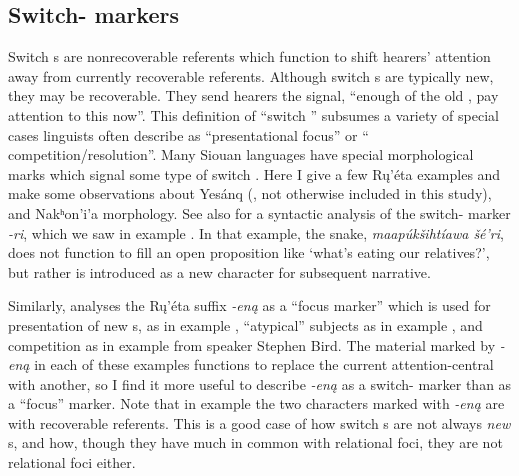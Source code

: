 \documentclass[output=paper]{LSP/langsci}
\begin{document}
\subsection{Switch- markers}\label{switchtopic}

	Switch s are nonrecoverable referents which function to shift hearers’ attention away from currently recoverable referents. Although switch s are typically new, they may be recoverable. They send hearers the signal, “enough of the old , pay attention to this now”. This definition of “switch ” subsumes a variety of special cases linguists often describe as “presentational focus” or “ competition/resolution”. Many Siouan languages have special morphological marks which signal some type of switch . Here I give a few Rų’éta examples and make some observations about Yesánq (, not otherwise included in this study),  and Nakʰon’i’a morphology. See also \citet[288--293]{Boyle2007} for a syntactic analysis of the  switch- marker \emph{-ri}, which we saw in example . In that example, the snake, \emph{maapúkšihtíawa šé’ri}, does not function to fill an open proposition like `what’s eating our relatives?', but rather is introduced as a new character for subsequent narrative.
	
	Similarly, \citet{Wolvengrey1991} analyses the Rų’éta suffix \emph{-eną} as a “focus marker” which is used for presentation of new s, as in example , “atypical” subjects as in example , and  competition as in example  from speaker Stephen Bird. The material marked by \emph{-eną} in each of these examples functions to replace the current attention-central   with another, so I find it more useful to describe \emph{-eną} as a switch- marker than as a “focus” marker. Note that in example  the two characters marked with \emph{-eną} are  with recoverable referents. This is a good case of how switch s are not always \emph{new} s, and how, though they have much in common with relational foci, they are not relational foci either.
\end{document}
